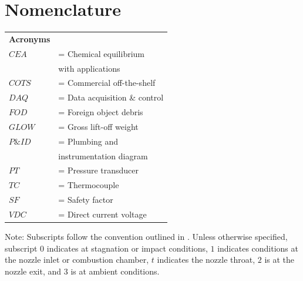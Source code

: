 \documentclass[9pt]{article} %
\numberwithin{equation}{section} %
\begin{document}
\section{Nomenclature} \label{sec: nomenclature}
\vspace{0.1cm}
\begin{tabular}{ll}
\textbf{Acronyms} \\ 
$CEA $ & = \quad Chemical equilibrium \\ 
$ $ & \qquad \enskip with applications \\
$COTS $ & = \quad Commercial off-the-shelf \\
$DAQ $ & = \quad Data acquisition \& control \\
$FOD $ & = \quad Foreign object debris \\
$GLOW $ & = \quad Gross lift-off weight \\
$P\&ID $ & = \quad Plumbing and \\
$ $ & \qquad \enskip instrumentation diagram\\
$PT $ & = \quad Pressure transducer \\
$TC $ & = \quad Thermocouple \\
$SF $ & = \quad Safety factor \\
$VDC $ & = \quad Direct current voltage \\
\end{tabular} 
\vspace{0.2cm} \newline
Note: Subscripts follow the convention outlined in \cite{rpe}. Unless otherwise specified, subscript $0$ indicates at stagnation or impact conditions, $1$ indicates conditions at the nozzle inlet or combustion chamber, $t$ indicates the nozzle throat, $2$ is at the nozzle exit, and $3$ is at ambient conditions.
\end{document}
